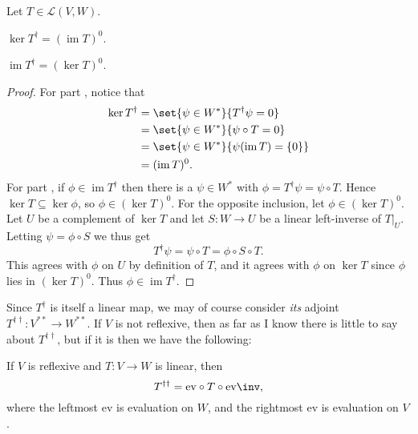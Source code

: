 \documentclass[a4paper, 11pt]{memoir}
\newcommand{\ev}{\mathrm{ev}}
\theoremstyle{plaincustomnumber}
\theoremstyle{changedotbreakcustomnumber}
\newcommand{\calL}{\mathcal{L}}
\newcommand{\im}{\operatorname{im}}
\begin{document}
\begin{proposition}
    \label{prop:operator-adjoint-kernel-image}
    Let $T \in \calL(V,W)$.
    \begin{enumprop}
        \item \label{enum:operator-adjoint-kernel} $\ker T^\dagger = (\im T)^0$.
        \item \label{enum:operator-adjoint-image} $\im T^\dagger = (\ker T)^0$.
    \end{enumprop}
\end{proposition}

\begin{proof}
    For part , notice that
    \begin{align*}
        \ker T^\dagger
            &= \set{\psi \in W^*}{T^\dagger \psi = 0} \\
            &= \set{\psi \in W^*}{\psi \circ T = 0} \\
            &= \set{\psi \in W^*}{\psi(\im T) = \{0\}} \\
            &= (\im T)^0.
    \end{align*}
    For part , if $\phi \in \im T^\dagger$ then there is a $\psi \in W^*$ with $\phi = T^\dagger \psi = \psi \circ T$. Hence $\ker T \subseteq \ker \phi$, so $\phi \in (\ker T)^0$. For the opposite inclusion, let $\phi \in (\ker T)^0$. Let $U$ be a complement of $\ker T$ and let $S \colon W \to U$ be a linear left-inverse of $T|_U$. Letting $\psi = \phi \circ S$ we thus get
    \begin{equation*}
        T^\dagger \psi
            = \psi \circ T
            = \phi \circ S \circ T.
    \end{equation*}
    This agrees with $\phi$ on $U$ by definition of $T$, and it agrees with $\phi$ on $\ker T$ since $\phi$ lies in $(\ker T)^0$. Thus $\phi \in \im T^\dagger$.
\end{proof}


Since $T^\dagger$ is itself a linear map, we may of course consider \emph{its} adjoint $T^{\dagger\dagger} \colon V^{**} \to W^{**}$. If $V$ is not reflexive, then as far as I know there is little to say about $T^{\dagger\dagger}$, but if it is then we have the following:

\begin{proposition}
    If $V$ is reflexive and $T \colon V \to W$ is linear, then
    \begin{equation*}
        T^{\dagger\dagger}
            = \ev \circ T \circ \ev\inv,
    \end{equation*}
    where the leftmost $\ev$ is evaluation on $W$, and the rightmost $\ev$ is evaluation on $V$.
\end{proposition}
\end{document}
